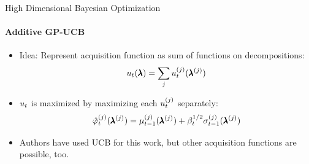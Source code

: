 \begin{frame}[c]{High Dimensional Bayesian Optimization}
\framesubtitle{Additive GP-UCB}
\begin{itemize}

    \item Idea: Represent acquisition function as sum of functions on decompositions:
    \begin{equation*}
        u_{t}(\pmb{\lambda}) = \sum_{j}u_{t}^{(j)}(\pmb{\lambda}^{(j)})
    \end{equation*}
\pause
\medskip    
    \item $u_{t}$ is maximized by maximizing each $u_{t}^{(j)}$ separately:
    \begin{equation*}
        \hat{\varphi}_{t}^{(j)}(\pmb{\lambda}^{(j)}) = \mu_{t-1}^{(j)}(\pmb{\lambda}^{(j)}) + \beta_{t}^{1/2}\sigma_{t-1}^{(j)}(\pmb{\lambda}^{(j)})
    \end{equation*}
    \item Authors have used UCB for this work, but other acquisition functions are possible, too.
\end{itemize}
\end{frame}
    
            
            
            
            
